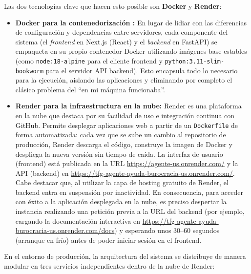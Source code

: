 \documentclass[12pt,a4paper,oneside]{report}
\begin{document}
Las dos tecnologías clave que hacen esto posible son \textbf{Docker} y \textbf{Render}:

\begin{itemize}
    \item \textbf{Docker para la contenedorización \cite{docker_docs}:} En lugar de lidiar con las diferencias de configuración y dependencias entre servidores, cada componente del sistema (el \textit{frontend} en Next.js (React) y el \textit{backend} en FastAPI) se empaqueta en su propio contenedor Docker utilizando imágenes base estables (como \texttt{node:18-alpine} para el cliente frontend y \texttt{python:3.11-slim-bookworm} para el servidor API backend). Esto encapsula todo lo necesario para la ejecución, aislando las aplicaciones y eliminando por completo el clásico problema del ``en mi máquina funcionaba''.
    
    \item \textbf{Render para la infraestructura en la nube:} Render es una plataforma en la nube que destaca por su facilidad de uso e integración continua con GitHub. Permite desplegar aplicaciones web a partir de un \texttt{Dockerfile} de forma automatizada: cada vez que se sube un cambio al repositorio de producción, Render descarga el código, construye la imagen de Docker y despliega la nueva versión sin tiempo de caída. La interfaz de usuario (frontend) está publicada en la URL \url{https://agente-us.onrender.com/} y la API (backend) en \url{https://tfg-agente-ayuda-burocracia-us.onrender.com/}. Cabe destacar que, al utilizar la capa de hosting gratuito de Render, el backend entra en suspensión por inactividad. En consecuencia, para acceder con éxito a la aplicación desplegada en la nube, es preciso despertar la instancia realizando una petición previa a la URL del backend (por ejemplo, cargando la documentación interactiva en \url{https://tfg-agente-ayuda-burocracia-us.onrender.com/docs}) y esperando unos 30--60 segundos (arranque en frío) antes de poder iniciar sesión en el frontend.
\end{itemize}

En el entorno de producción, la arquitectura del sistema se distribuye de manera modular en tres servicios independientes dentro de la nube de Render:
\end{document}

